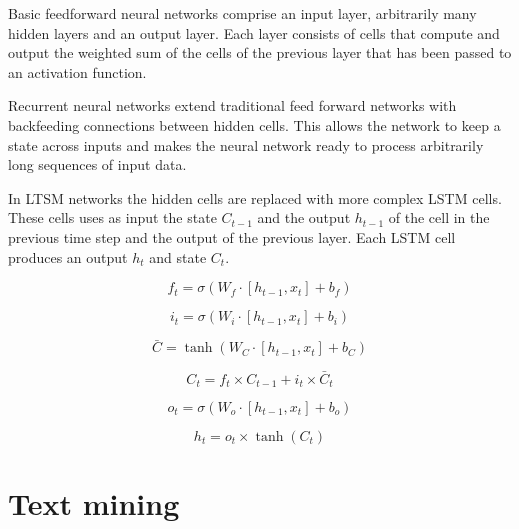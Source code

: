Basic feedforward neural networks comprise an input layer, arbitrarily many hidden layers and an output layer. Each layer consists of cells that compute and output the weighted sum of the cells of the previous layer that has been passed to an activation function.


Recurrent neural networks extend traditional feed forward networks with backfeeding connections between hidden cells.
This allows the network to keep a state across inputs and makes the neural network ready to process arbitrarily long sequences of input data.

In LTSM networks the hidden cells are replaced with more complex LSTM cells. These cells uses as input the state $C_{t-1}$ and the output $h_{t-1}$ of the cell in the previous time step and the output of the previous layer. Each LSTM cell produces an output $h_t$ and state $C_t$.


\begin{equation}\label{key}
	f_t = \sigma(W_f \cdot [h_{t-1}, x_t] + b_f)
\end{equation}

\begin{equation}\label{key}
	i_t = \sigma (W_i \cdot [h_{t-1}, x_t] + b_i)
\end{equation}

\begin{equation}\label{key}
	\bar{C} = \tanh (W_C \cdot [h_{t-1}, x_t] + b_C)
\end{equation}

\begin{equation}\label{key}
	C_t = f_t \times C_{t-1} + i_t \times \bar{C}_t
\end{equation}

\begin{equation}\label{key}
	o_t = \sigma (W_o \cdot [h_{t-1}, x_t] + b_o)
\end{equation}

\begin{equation}\label{key}
	h_t = o_t \times \tanh(C_t )
\end{equation}


\section{Text mining}